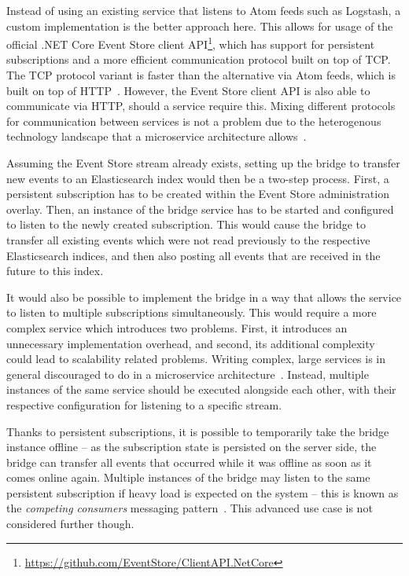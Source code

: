 Instead of using an existing service that listens to Atom feeds such as Logstash, a custom implementation is the better approach here.
This allows for usage of the official .NET Core Event Store client \ac{API}\footnote{\url{https://github.com/EventStore/ClientAPI.NetCore}}, which has support for persistent subscriptions and a more efficient communication protocol built on top of \ac{TCP}.
The \ac{TCP} protocol variant is faster than the alternative via Atom feeds, which is built on top of \ac{HTTP}~\cite{WEB:EvtSt-Which-Api}.
However, the Event Store client \ac{API} is also able to communicate via \ac{HTTP}, should a service require this.
Mixing different protocols for communication between services is not a problem due to the heterogenous technology landscape that a microservice architecture allows~\cite[Key Benefits,pp.~4f]{newman2015building}.


Assuming the Event Store stream already exists, setting up the bridge to transfer new events to an Elasticsearch index would then be a two-step process.
First, a persistent subscription has to be created within the Event Store administration overlay.
Then, an instance of the bridge service has to be started and configured to listen to the newly created subscription.
This would cause the bridge to transfer all existing events which were not read previously to the respective Elasticsearch indices, and then also posting all events that are received in the future to this index.

It would also be possible to implement the bridge in a way that allows the service to listen to multiple subscriptions simultaneously.
This would require a more complex service which introduces two problems.
First, it introduces an unnecessary implementation overhead, and second, its additional complexity could lead to scalability related problems.
Writing complex, large services is in general discouraged to do in a microservice architecture~\cite[Key Benefits,pp.~5f]{newman2015building}.
Instead, multiple instances of the same service should be executed alongside each other, with their respective configuration for listening to a specific stream.

Thanks to persistent subscriptions, it is possible to temporarily take the bridge instance offline -- as the subscription state is persisted on the server side, the bridge can transfer all events that occurred while it was offline as soon as it comes online again.
Multiple instances of the bridge may listen to the same persistent subscription if heavy load is expected on the system -- this is known as the \emph{competing consumers} messaging pattern~\cite{WEB:Microsoft-Competing-Consumers}.
This advanced use case is not considered further though.

